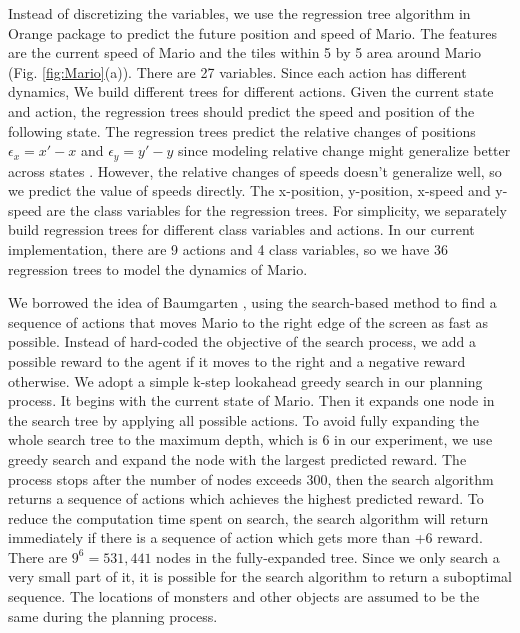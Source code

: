 Instead of discretizing the variables, we use the regression tree algorithm
in Orange package \cite{Orange04} to predict the future position and speed of Mario.
The features are the current speed of Mario and the tiles within 5 by 5 
area around Mario (Fig. \ref{fig:Mario}(a)). There are 27 variables. 
Since each action has different dynamics, 
We build different trees for different actions. 
Given the current state and action, the regression trees should predict 
the speed and position of the following state. 
The regression trees predict
the relative changes of positions $\epsilon_x = x' - x$ and 
$\epsilon_y = y' - y$ since modeling relative change might generalize better across states \cite{Hester09}.
However, the relative changes of speeds doesn't generalize well, so we predict
the value of speeds directly.
The x-position, y-position, x-speed and y-speed are the class variables for the regression trees.
For simplicity, we separately build regression trees for different class variables and actions. 
In our current implementation, there are 9 actions and 4 class variables, so we 
have 36 regression trees to model the dynamics of Mario. 

We borrowed the idea of Baumgarten \cite{Robin09}, using
the search-based method to find a sequence of actions that moves Mario to the right edge of the screen as fast as possible.
Instead of hard-coded the objective of the search process, we add a possible reward to the agent if it moves
to the right and a negative reward otherwise.
We adopt a simple k-step lookahead greedy search in our planning process.
It begins with the current state of Mario. 
Then it expands one node in the search tree by applying all possible actions. 
To avoid fully expanding the whole search tree to 
the maximum depth, which is 6 in our experiment, we use greedy search and expand the node
with the largest predicted reward. 
The process stops after the number of nodes exceeds 300, then the search algorithm returns 
a sequence of actions which achieves the highest predicted reward.
To reduce the computation time spent on search, the search algorithm will return
immediately if there is a sequence of action which gets more than +6 reward.
There are $9^6=531,441$ nodes in the fully-expanded tree. 
Since we only search a very small part of it, it is possible for the search algorithm
to return a suboptimal sequence.
The locations of monsters and other objects are assumed to be the same
during the planning process. 

